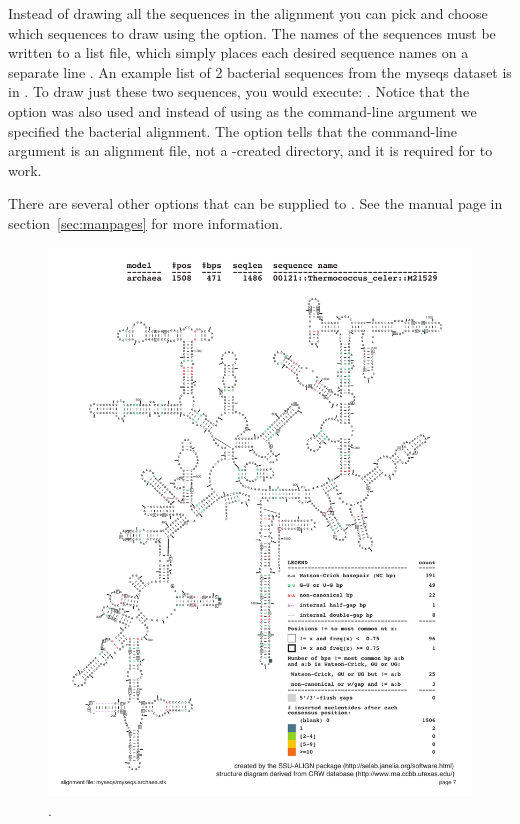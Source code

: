 Instead of drawing all the sequences in the alignment you can pick and
choose which sequences to draw using the 
option. The names of the sequences must be written to a list file,
which simply places each desired sequence names on a separate
line . An example list of 2 bacterial sequences from
the myseqs dataset is in . To draw just
these two sequences, you would execute: 
 .
Notice that the  option was also used and instead of using
 as the command-line argument we specified the bacterial
alignment. The  option tells  that the
command-line argument is an alignment file, not a
-created directory, and it is required for
 to work. 

There are several other options that can be supplied to
. See the  manual page in
section~\ref{sec:manpages} for more information. 

\begin{figure}
  \begin{center}
\includegraphics[width=6.5in]{Figures/myseqs-archaea-indi-1}
        \caption[Information content per consensus position of the
          archaeal alignment created in the tutorial].
  \end{center}
\label{fig:myseqs-archaea-indi-1}
\end{figure}

